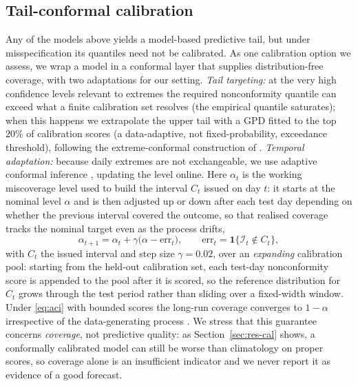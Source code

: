 \documentclass[11pt,a4paper]{article}
\newcommand{\Ind}{\mathcal{I}}                 %
\begin{document}
\subsection{Tail-conformal calibration}\label{sec:conformal}
Any of the models above yields a model-based predictive tail, but under
misspecification its quantiles need not be calibrated. As one calibration option
we assess, we wrap a model in a conformal layer \citep{vovk2005,romano2019cqr}
that supplies distribution-free coverage, with two adaptations for our setting.
\emph{Tail targeting:} at the very high confidence levels relevant to extremes the
required nonconformity quantile can exceed what a finite calibration set resolves
(the empirical quantile saturates); when this happens we extrapolate the upper
tail with a GPD fitted to the top $20\%$ of calibration scores (a
data-adaptive, not fixed-probability, exceedance threshold), following the
extreme-conformal construction of \citet{pasche2025extreme}.
\emph{Temporal adaptation:} because daily extremes are not exchangeable, we use
adaptive conformal inference \citep{gibbs2021adaptive}, updating the level online.
Here $\alpha_t$ is the working miscoverage level used to build the interval $C_t$
issued on day $t$: it starts at the nominal level $\alpha$ and is then adjusted
up or down after each test day depending on whether the previous interval
covered the outcome, so that realised coverage tracks the nominal target even
as the process drifts,
\begin{equation}\label{eq:aci}
\alpha_{t+1} = \alpha_t + \gamma\big(\alpha-\mathrm{err}_t\big),\qquad
\mathrm{err}_t=\mathbf{1}\{\Ind_t\notin C_t\},
\end{equation}
with $C_t$ the issued interval and step size $\gamma=0.02$, over an
\emph{expanding} calibration pool: starting from the held-out calibration set,
each test-day nonconformity score is appended to the pool after it is scored,
so the reference distribution for $C_t$ grows through the test period rather
than sliding over a fixed-width window. Under \eqref{eq:aci} with bounded
scores the long-run
coverage converges to $1-\alpha$ irrespective of the data-generating process
\citep{gibbs2021adaptive}. We stress that this guarantee concerns \emph{coverage},
not predictive quality: as Section~\ref{sec:res-cal} shows, a conformally
calibrated model can still be worse than climatology on proper scores, so coverage
alone is an insufficient indicator and we never report it as evidence of a good
forecast.
\end{document}
